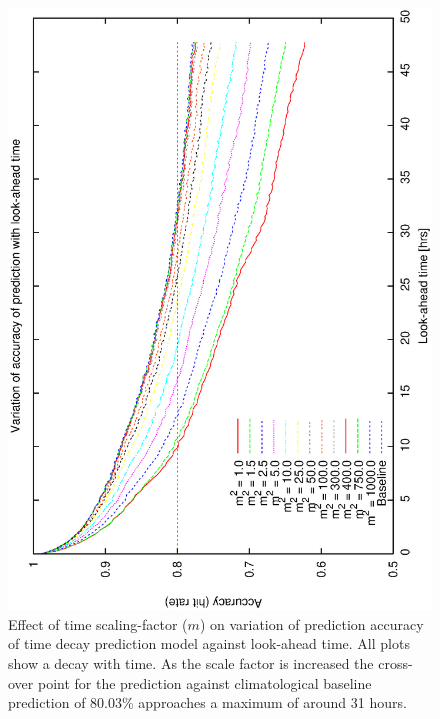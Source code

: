 {{\begin{figure}[htbp] 
  \begin{center}
    \includegraphics[scale=0.4, angle=-90]{figures/ecs/gbc_predict.eps}
  \end{center}
  \caption[Accuracy of look-ahead weather prediction using time decay model]
  {Effect of time scaling-factor ($m$) on variation of prediction accuracy of time decay prediction model against look-ahead time. All plots show a decay with time. As the scale factor is increased the cross-over point for the prediction against climatological baseline prediction of 80.03\% approaches a maximum of around 31 hours. }
  \label{fig:gbc_prediction}
\end{figure}

}}
